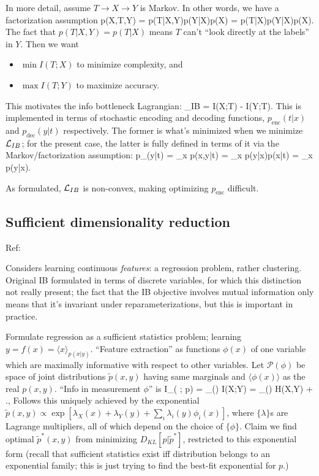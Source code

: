 \documentclass[notitlepage,openany,11pt]{report}
\theoremstyle{plain}%
\numberwithin{equation}{section}
\begin{document}
In more detail, assume $T \rightarrow X \rightarrow Y$ is Markov. In other words, we have a factorization assumption
\be
p(X,T,Y) = p(T|X,Y)p(Y|X)p(X) = p(T|X)p(Y|X)p(X).
\ee
The fact that $p(T|X,Y) = p(T|X)$ means $T$ can't ``look directly at the labels'' in $Y$. Then we want 
\begin{itemize}
\item $\min I(T;X)$ to minimize complexity, and
\item $\max I(T;Y)$ to maximize accuracy.
\end{itemize}
This motivates the info bottleneck Lagrangian:
\be
{}_{IB} = I(X;T) - \beta I(Y;T).
 This is implemented in terms of stochastic encoding and decoding functions, $p_{\text{enc}}(t|x)$ and $p_{\text{dec}}(y|t)$ respectively. The former is what's minimized when we minimize $\mcal{L}_{IB}$; for the present case, the latter is fully defined in terms of it via the Markov/factorization assumption:
\be
p_{}(y|t) = \sum_{x} p(x,y|t) = \sum_{x} p(y|x)p(x|t) = \sum_{x} p(y|x).
\ee

As formulated, $\mathcal{L}_{IB}$ is non-convex, making optimizing $p_{\text{enc}}$ difficult.


\subsection{Sufficient dimensionality reduction}
Ref: \cite{GlobersonTishby:03}

Considers learning continuous \emph{features}: a regression problem, rather clustering. Original IB formulated in terms of discrete variables, for which this distinction not really present; the fact that the IB objective involves mutual information only means that it's invariant under reparameterizations, but this is important in practice.

Formulate regression as a sufficient statistics problem; learning $y = f(x) = \langle x \rangle_{p(x|y)}$. ``Feature extraction'' as functions $\phi(x)$ of one variable which are maximally informative with respect to other variables. Let $\mathcal{P}(\phi)$ be space of joint distributions $\widetilde{p}(x,y)$ having same marginals and $\langle \phi(x) \rangle$ as the real $p(x,y)$. ``Info in measurement $\phi$'' is 
\be
I_{}( \phi; p) = \min_{(\phi)} I(X;Y) = \max_{(\phi)} H(X,Y) + ., 
\ee
Follows this uniquely achieved by the exponential $\widetilde{p}(x,y) \propto \exp \left[\lambda_{X}(x) + \lambda_{Y}(y) + \sum_{i} \lambda_{i}(y) \phi_{i}(x)\right]$, where $\{\lambda\}$s are Lagrange multipliers, all of which depend on the choice of $\{\phi\}$. Claim we find optimal $\widetilde{p}^{\ast}(x,y)$ from minimizing $D_{KL}[p | \widetilde{p}^{\ast}]$, restricted to this exponential form (recall that sufficient statistics exist iff distribution belongs to an exponential family; this is just trying to find the best-fit exponential for $p$.)
\end{document}
